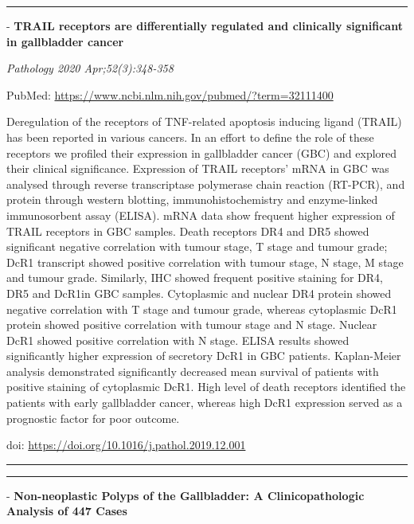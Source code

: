 \documentclass[
]{article}
\begin{document}
\begin{center}\rule{0.5\linewidth}{0.5pt}\end{center}

- \textbf{TRAIL receptors are differentially regulated and clinically
significant in gallbladder cancer}

\emph{Pathology 2020 Apr;52(3):348-358}

PubMed: \url{https://www.ncbi.nlm.nih.gov/pubmed/?term=32111400}

Deregulation of the receptors of TNF-related apoptosis inducing ligand
(TRAIL) has been reported in various cancers. In an effort to define the
role of these receptors we profiled their expression in gallbladder
cancer (GBC) and explored their clinical significance. Expression of
TRAIL receptors' mRNA in GBC was analysed through reverse transcriptase
polymerase chain reaction (RT-PCR), and protein through western
blotting, immunohistochemistry and enzyme-linked immunosorbent assay
(ELISA). mRNA data show frequent higher expression of TRAIL receptors in
GBC samples. Death receptors DR4 and DR5 showed significant negative
correlation with tumour stage, T stage and tumour grade; DcR1 transcript
showed positive correlation with tumour stage, N stage, M stage and
tumour grade. Similarly, IHC showed frequent positive staining for DR4,
DR5 and DcR1in GBC samples. Cytoplasmic and nuclear DR4 protein showed
negative correlation with T stage and tumour grade, whereas cytoplasmic
DcR1 protein showed positive correlation with tumour stage and N stage.
Nuclear DcR1 showed positive correlation with N stage. ELISA results
showed significantly higher expression of secretory DcR1 in GBC
patients. Kaplan-Meier analysis demonstrated significantly decreased
mean survival of patients with positive staining of cytoplasmic DcR1.
High level of death receptors identified the patients with early
gallbladder cancer, whereas high DcR1 expression served as a prognostic
factor for poor outcome.

doi: \url{https://doi.org/10.1016/j.pathol.2019.12.001}

\begin{center}\rule{0.5\linewidth}{0.5pt}\end{center}

\begin{center}\rule{0.5\linewidth}{0.5pt}\end{center}

- \textbf{Non-neoplastic Polyps of the Gallbladder: A Clinicopathologic
Analysis of 447 Cases}
\end{document}
